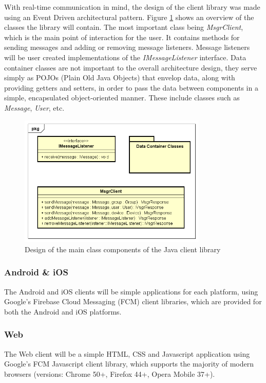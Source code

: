With real-time communication in mind, the design of the client library was made using an Event Driven architectural pattern. Figure \ref{fig:java-client-classes} shows an overview of the classes the library will contain. The most important class being \textit{MsgrClient}, which is the main point of interaction for the user. It contains methods for sending messages and adding or removing message listeners. Message listeners will be user created implementations of the \textit{IMessageListener} interface. Data container classes are not important to the overall architecture design, they serve simply as POJOs (Plain Old Java Objects) that envelop data, along with providing getters and setters, in order to pass the data between components in a simple, encapsulated object-oriented manner. These include classes such as \textit{Message}, \textit{User}, etc.

\begin{figure}[H]
	\centering
	\includegraphics[width=0.8\textwidth]{figures/03_design/java-client-classes}
    \caption{Design of the main class components of the Java client library}
    \label{fig:java-client-classes}
\end{figure}

\subsubsection*{Android \& iOS}
The Android and iOS clients will be simple applications for each platform, using Google's Firebase Cloud Messaging (FCM) client libraries, which are provided for both the Android\cite{fcm-android-client} and iOS\cite{fcm-ios-client} platforms.

\subsubsection*{Web}
The Web client will be a simple HTML, CSS and Javascript application using Google's FCM Javascript client library, which supports the majority of modern browsers (versions: Chrome 50+, Firefox 44+, Opera Mobile 37+)\cite{fcm-web-client}.

